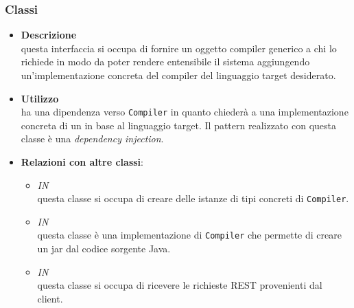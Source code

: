 \subsubsection{Classi}
\label{\nogloxy{swedesigner::server::compiler::Compiler}}
\begin{itemize}
\item \textbf{Descrizione}\\
questa interfaccia si occupa di fornire un oggetto compiler generico a chi lo richiede in modo da poter rendere entensibile il sistema aggiungendo un'implementazione concreta del compiler del linguaggio target desiderato.
\item \textbf{Utilizzo}\\
 ha una dipendenza verso \texttt{Compiler} in quanto chiederà a  una implementazione concreta di un  in base al linguaggio target. Il pattern realizzato con questa classe è una \emph{dependency injection}.
\item \textbf{Relazioni con altre classi}:
\begin{itemize}
\item \textit{IN} \hyperref[\nogloxy{swedesigner::server::compiler::CompilerAssembler}]{}\\
questa classe si occupa di creare delle istanze di tipi concreti di \texttt{Compiler}. 
\item \textit{IN} \hyperref[\nogloxy{swedesigner::server::compiler::java::JavaCompiler}]{}\\
questa classe è una implementazione di \texttt{Compiler} che permette di creare un jar dal codice sorgente Java.
\item \textit{IN} \hyperref[\nogloxy{swedesigner::server::controller::RequestHandlerController}]{}\\
questa classe si occupa di ricevere le richieste REST provenienti dal client.
\end{itemize}
\end{itemize}

